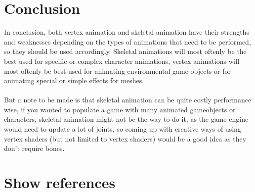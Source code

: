 \documentclass{scrartcl}
\begin{document}
\section{Conclusion}
In conclusion, both vertex animation and skeletal animation have their strengths and weaknesses depending on the types of animations that need to be performed, so they should be used accordingly. Skeletal animations will most oftenly be the best used for specific or complex character animations, vertex animations will most oftenly be best used for animating environmental game objects or for animating special or simple effects for meshes.
\\~\\
But a note to be made is that skeletal animation can be quite costly performance wise, if you wanted to populate a game with many animated gameobjects or characters, skeletal animation might not be the way to do it, as the game engine would need to update a lot of joints, so coming up with creative ways of using vertex shaders (but not limited to vertex shaders) would be a good idea as they don't require bones.

\section{Show references}
\cite{one}\cite{two}\cite{three}\cite{four}\cite{five}\cite{six}\cite{seven}\cite{eight}\cite{nine}\cite{ten}\cite{eleven}\cite{twelve}\cite{thirteen}


\end{document}
